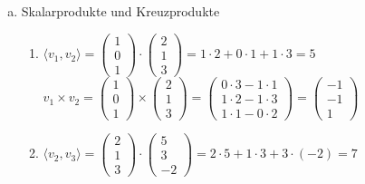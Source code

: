 \documentclass{standalone}
\begin{document}
\begin{enumerate}[a)]
    \item Skalarprodukte und Kreuzprodukte
    \begin{enumerate}
        \item $\langle v_1,v_2 \rangle = 
        \begin{pmatrix}
            1 \\ 0 \\ 1
        \end{pmatrix}
        \cdot \begin{pmatrix}
            2 \\ 1 \\ 3
        \end{pmatrix}
        = 1 \cdot 2 + 0 \cdot 1 + 1 \cdot 3 = 5$ \\
        
        $ v_1 \times v_2 = 
        \begin{pmatrix}
            1 \\ 0 \\ 1
        \end{pmatrix}
        \times \begin{pmatrix}
            2 \\ 1 \\ 3
        \end{pmatrix}
        = \begin{pmatrix}
            0 \cdot 3 - 1 \cdot 1 \\ 1 \cdot 2 - 1 \cdot 3 \\ 1 \cdot 1 - 0 \cdot 2
        \end{pmatrix}
        = \begin{pmatrix}
            -1 \\ -1 \\ 1
        \end{pmatrix}$

        \item $\langle v_2,v_3 \rangle = 
        \begin{pmatrix}
            2 \\ 1 \\ 3
        \end{pmatrix}
        \cdot \begin{pmatrix}
            5 \\ 3 \\ -2
        \end{pmatrix}
        = 2 \cdot 5 + 1 \cdot 3 + 3 \cdot (-2) = 7$ \\
        

\end{enumerate}
\end{enumerate}
\end{document}
